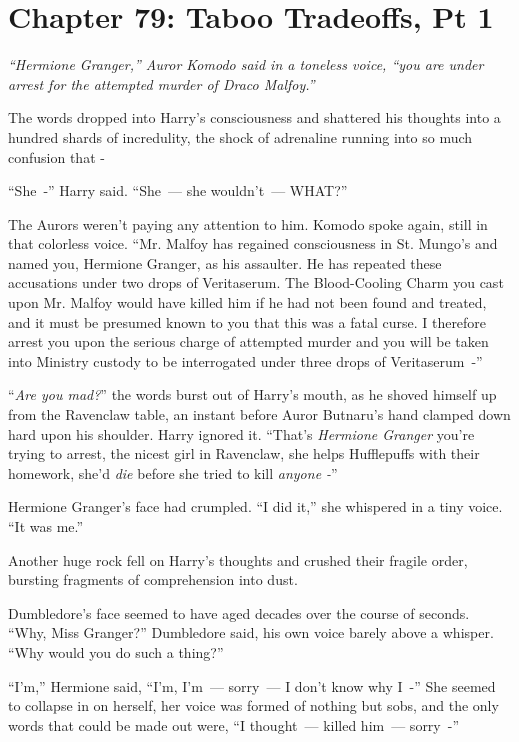 \chapter{Chapter 79: Taboo Tradeoffs, Pt 1}
\emph{``Hermione Granger,'' Auror Komodo said in a toneless voice, ``you are under arrest for the attempted murder of Draco Malfoy.''}

The words dropped into Harry's consciousness and shattered his thoughts into a hundred shards of incredulity, the shock of adrenaline running into so much confusion that -

``She~-'' Harry said. ``She~--- she wouldn't~--- WHAT?''

The Aurors weren't paying any attention to him. Komodo spoke again, still in that colorless voice. ``Mr. Malfoy has regained consciousness in St. Mungo's and named you, Hermione Granger, as his assaulter. He has repeated these accusations under two drops of Veritaserum. The Blood-Cooling Charm you cast upon Mr. Malfoy would have killed him if he had not been found and treated, and it must be presumed known to you that this was a fatal curse. I therefore arrest you upon the serious charge of attempted murder and you will be taken into Ministry custody to be interrogated under three drops of Veritaserum~-''

``\emph{Are you mad?}'' the words burst out of Harry's mouth, as he shoved himself up from the Ravenclaw table, an instant before Auror Butnaru's hand clamped down hard upon his shoulder. Harry ignored it. ``That's \emph{Hermione Granger} you're trying to arrest, the nicest girl in Ravenclaw, she helps Hufflepuffs with their homework, she'd \emph{die} before she tried to kill \emph{anyone -}''

Hermione Granger's face had crumpled. ``I did it,'' she whispered in a tiny voice. ``It was me.''

Another huge rock fell on Harry's thoughts and crushed their fragile order, bursting fragments of comprehension into dust.

Dumbledore's face seemed to have aged decades over the course of seconds. ``Why, Miss Granger?'' Dumbledore said, his own voice barely above a whisper. ``Why would you do such a thing?''

``I'm,'' Hermione said, ``I'm, I'm~--- sorry~--- I don't know why I~-'' She seemed to collapse in on herself, her voice was formed of nothing but sobs, and the only words that could be made out were, ``I thought~--- killed him~--- sorry~-''


